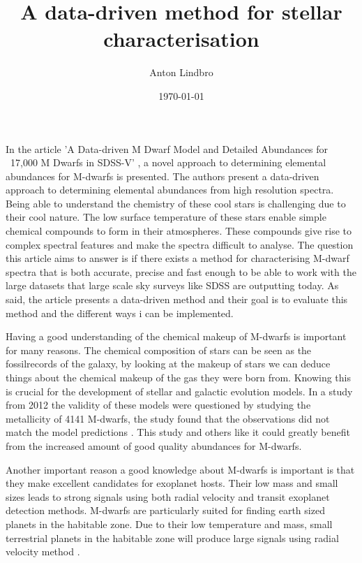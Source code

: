 \documentclass[a4paper]{article}
\title{A data-driven method for stellar characterisation}
\author{Anton Lindbro}
\date{\today}
\begin{document}
\maketitle


In the article 'A Data-driven M Dwarf Model and Detailed Abundances for ~17,000 M Dwarfs in SDSS-V' \citep{2025ApJ...982...13B}, a novel approach to determining elemental abundances for M-dwarfs is presented. The authors present a data-driven approach to determining elemental abundances from high resolution spectra. Being able to understand the chemistry of these cool stars is challenging due to their cool nature. The low surface temperature of these stars enable simple chemical compounds to form in their atmospheres. These compounds give rise to complex spectral features and make the spectra difficult to analyse. The question this  article aims to answer is if there exists a method for characterising M-dwarf spectra that is both accurate, precise and fast enough to be able to work with the large datasets that large scale sky surveys like SDSS are outputting today. As said, the article presents a data-driven method and their goal is to evaluate this method and the different ways i can be implemented. 

Having a good understanding of the chemical makeup of M-dwarfs is important for many reasons. The chemical composition of stars can be seen as the fossilrecords of the galaxy, by looking at the makeup of stars we can deduce things about the chemical makeup of the gas they were born from. Knowing this is crucial for the development of stellar and galactic evolution models. In a study from 2012 the validity of these models were questioned by studying the metallicity of 4141 M-dwarfs, the study found that the observations did not match the model predictions \citep{2012MNRAS.422.1489W}. This study and others like it could greatly benefit from the increased amount of good quality abundances for M-dwarfs.

Another important reason a good knowledge about M-dwarfs is important is that they make excellent candidates for exoplanet hosts. Their low mass and small sizes leads to strong signals using both radial velocity and transit exoplanet detection methods. M-dwarfs are particularly suited for finding earth sized planets in the habitable zone. Due to their low temperature and mass, small terrestrial planets in the habitable zone will produce large signals using radial velocity method \citep{2018A&A...609A.117T}. 
\end{document}
